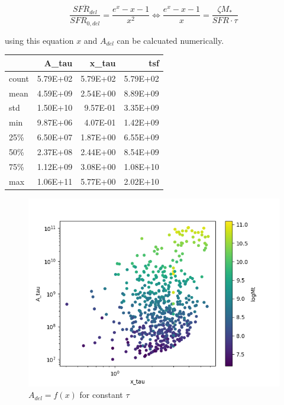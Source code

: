 \documentclass[a4paper,twocolumn]{article}
\begin{document}
$$
    \frac{\overline{SFR_{del}}}{SFR_{0,del}}=\frac{e^x-x-1}{x^2}\Leftrightarrow \frac{e^x-x-1}{x}=\frac{\zeta M_*}{SFR\cdot\tau}
$$

using this equation \(x\) and \(A_{del}\) can be calcuated numerically.

\begin{table}[hc]
\centering
\begin{tabular}{lrrr}
\toprule
{} &    A\_tau &    x\_tau &      tsf \\
\midrule
count & 5.79E+02 & 5.79E+02 & 5.79E+02 \\
mean  & 4.59E+09 & 2.54E+00 & 8.89E+09 \\
std   & 1.50E+10 & 9.57E-01 & 3.35E+09 \\
min   & 9.87E+06 & 4.07E-01 & 1.42E+09 \\
25\%   & 6.50E+07 & 1.87E+00 & 6.55E+09 \\
50\%   & 2.37E+08 & 2.44E+00 & 8.54E+09 \\
75\%   & 1.12E+09 & 3.08E+00 & 1.08E+10 \\
max   & 1.06E+11 & 5.77E+00 & 2.02E+10 \\
\bottomrule
\end{tabular}
\end{table}

\begin{figure}[!htpb]
\centering
\includegraphics[width=.9\linewidth]{./figs/x-A_tau.png}
\caption{\label{fig:$A_{del} = f(x)$ for constant $\tau$}\(A_{del} = f(x)\) for constant \(\tau\)}
\end{figure}
\end{document}
